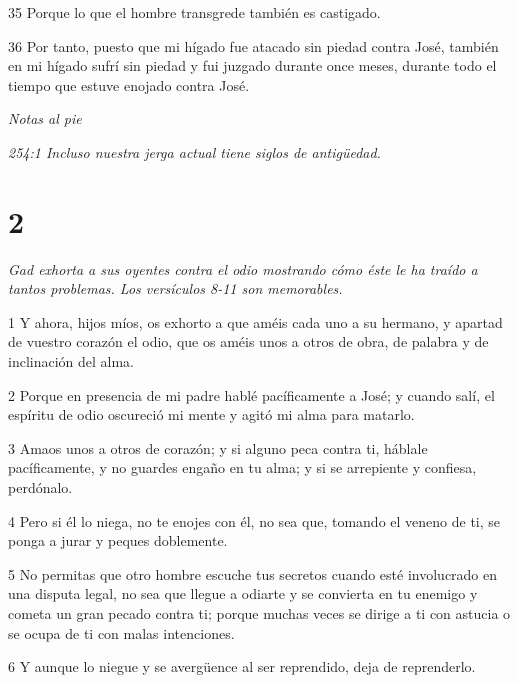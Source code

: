 \par 35 Porque lo que el hombre transgrede también es castigado.

\par 36 Por tanto, puesto que mi hígado fue atacado sin piedad contra José, también en mi hígado sufrí sin piedad y fui juzgado durante once meses, durante todo el tiempo que estuve enojado contra José.

\par \textit{Notas al pie}

\par \textit{254:1 Incluso nuestra jerga actual tiene siglos de antigüedad.}

\chapter{2}

\par \textit{Gad exhorta a sus oyentes contra el odio mostrando cómo éste le ha traído a tantos problemas. Los versículos 8-11 son memorables.}

\par 1 Y ahora, hijos míos, os exhorto a que améis cada uno a su hermano, y apartad de vuestro corazón el odio, que os améis unos a otros de obra, de palabra y de inclinación del alma.

\par 2 Porque en presencia de mi padre hablé pacíficamente a José; y cuando salí, el espíritu de odio oscureció mi mente y agitó mi alma para matarlo.

\par 3 Amaos unos a otros de corazón; y si alguno peca contra ti, háblale pacíficamente, y no guardes engaño en tu alma; y si se arrepiente y confiesa, perdónalo.

\par 4 Pero si él lo niega, no te enojes con él, no sea que, tomando el veneno de ti, se ponga a jurar y peques doblemente.

\par 5 No permitas que otro hombre escuche tus secretos cuando esté involucrado en una disputa legal, no sea que llegue a odiarte y se convierta en tu enemigo y cometa un gran pecado contra ti; porque muchas veces se dirige a ti con astucia o se ocupa de ti con malas intenciones.

\par 6 Y aunque lo niegue y se avergüence al ser reprendido, deja de reprenderlo.

